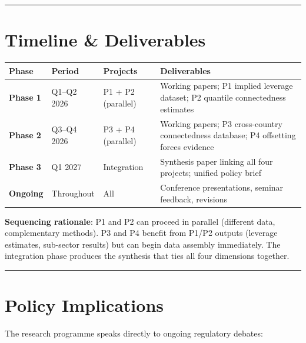 \documentclass[11pt,a4paper]{article}
\begin{document}
\bigskip\noindent\rule{\textwidth}{0.4pt}\bigskip


\section{Timeline \& Deliverables}


{\small
\begin{longtable}{|p{}|p{}|p{}|p{}|}
\hline
\textbf{Phase} & \textbf{Period} & \textbf{Projects} & \textbf{Deliverables} \\
\hline
\endhead
\textbf{Phase 1} & Q1--Q2 2026 & P1 + P2 (parallel) & Working papers; P1 implied leverage dataset; P2 quantile connectedness estimates \\
\hline
\textbf{Phase 2} & Q3--Q4 2026 & P3 + P4 (parallel) & Working papers; P3 cross-country connectedness database; P4 offsetting forces evidence \\
\hline
\textbf{Phase 3} & Q1 2027 & Integration & Synthesis paper linking all four projects; unified policy brief \\
\hline
\textbf{Ongoing} & Throughout & All & Conference presentations, seminar feedback, revisions \\
\hline
\end{longtable}
}

\textbf{Sequencing rationale}: P1 and P2 can proceed in parallel (different data, complementary methods). P3 and P4 benefit from P1/P2 outputs (leverage estimates, sub-sector results) but can begin data assembly immediately. The integration phase produces the synthesis that ties all four dimensions together.


\bigskip\noindent\rule{\textwidth}{0.4pt}\bigskip


\section{Policy Implications}

The research programme speaks directly to ongoing regulatory debates:
\end{document}
